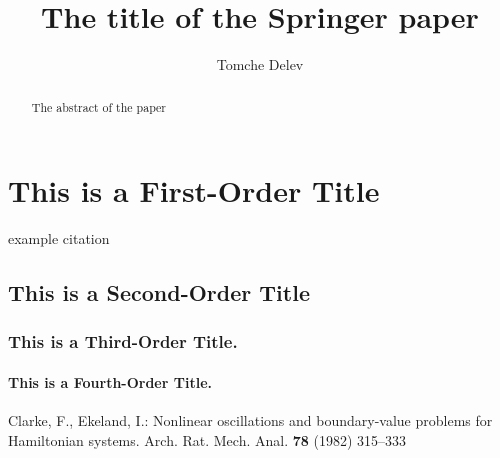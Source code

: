 \documentclass[oribibl]{llncs}
\begin{document}
\title{The title of the Springer paper}

\author{Tomche Delev}



\maketitle

\begin{abstract}
The abstract of the paper
\end{abstract}

\section{This is a First-Order Title}
example citation \cite{clar:eke}

\subsection{This is a Second-Order Title}
\subsubsection{This is a Third-Order Title.}
\paragraph{This is a Fourth-Order Title.}



\begin{thebibliography}{[MT1]}

Clarke, F., Ekeland, I.:
Nonlinear oscillations and boundary-value problems for
Hamiltonian systems.
Arch. Rat. Mech. Anal. {\bfseries 78} (1982) 315--333

\end{thebibliography}
\end{document}
